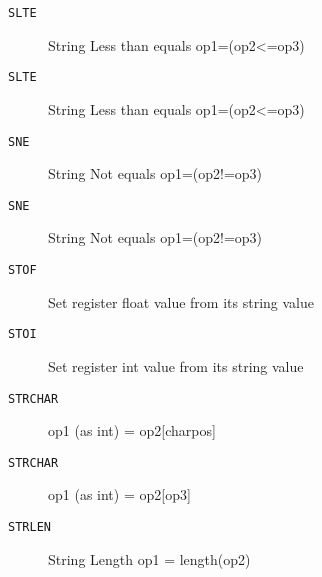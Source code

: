
\begin{description}
\item[\texttt{SLTE       }]  String Less than equals op1=(op2<=op3)\\
\end{description}

\begin{description}
\item[\texttt{SLTE       }]  String Less than equals op1=(op2<=op3)\\
\end{description}

\begin{description}
\item[\texttt{SNE        }]  String Not equals op1=(op2!=op3)\\
\end{description}

\begin{description}
\item[\texttt{SNE        }]  String Not equals op1=(op2!=op3)\\
\end{description}

\begin{description}
\item[\texttt{STOF       }]  Set register float value from its string value\\
\end{description}

\begin{description}
\item[\texttt{STOI       }]  Set register int value from its string value\\
\end{description}

\begin{description}
\item[\texttt{STRCHAR    }]  op1 (as int) = op2[charpos]\\
\end{description}

\begin{description}
\item[\texttt{STRCHAR    }]  op1 (as int) = op2[op3]\\
\end{description}

\begin{description}
\item[\texttt{STRLEN     }]  String Length op1 = length(op2)\\
\end{description}

